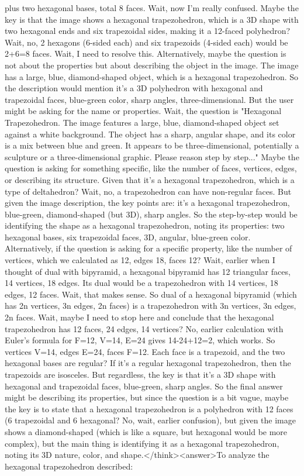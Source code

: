 plus two hexagonal bases, total 8 faces. Wait, now I'm really confused. Maybe the key is that the image shows a hexagonal trapezohedron, which is a 3D shape with two hexagonal ends and six trapezoidal sides, making it a 12-faced polyhedron? Wait, no, 2 hexagons (6-sided each) and six trapezoids (4-sided each) would be 2+6=8 faces. Wait, I need to resolve this. Alternatively, maybe the question is not about the properties but about describing the object in the image. The image has a large, blue, diamond-shaped object, which is a hexagonal trapezohedron. So the description would mention it's a 3D polyhedron with hexagonal and trapezoidal faces, blue-green color, sharp angles, three-dimensional. But the user might be asking for the name or properties. Wait, the question is "Hexagonal Trapezohedron. The image features a large, blue, diamond-shaped object set against a white background. The object has a sharp, angular shape, and its color is a mix between blue and green. It appears to be three-dimensional, potentially a sculpture or a three-dimensional graphic. Please reason step by step..." Maybe the question is asking for something specific, like the number of faces, vertices, edges, or describing its structure. Given that it's a hexagonal trapezohedron, which is a type of deltahedron? Wait, no, a trapezohedron can have non-regular faces. But given the image description, the key points are: it's a hexagonal trapezohedron, blue-green, diamond-shaped (but 3D), sharp angles. So the step-by-step would be identifying the shape as a hexagonal trapezohedron, noting its properties: two hexagonal bases, six trapezoidal faces, 3D, angular, blue-green color. Alternatively, if the question is asking for a specific property, like the number of vertices, which we calculated as 12, edges 18, faces 12? Wait, earlier when I thought of dual with bipyramid, a hexagonal bipyramid has 12 triangular faces, 14 vertices, 18 edges. Its dual would be a trapezohedron with 14 vertices, 18 edges, 12 faces. Wait, that makes sense. So dual of a hexagonal bipyramid (which has 2n vertices, 3n edges, 2n faces) is a trapezohedron with 3n vertices, 3n edges, 2n faces. Wait, maybe I need to stop here and conclude that the hexagonal trapezohedron has 12 faces, 24 edges, 14 vertices? No, earlier calculation with Euler's formula for F=12, V=14, E=24 gives 14-24+12=2, which works. So vertices V=14, edges E=24, faces F=12. Each face is a trapezoid, and the two hexagonal bases are regular? If it's a regular hexagonal trapezohedron, then the trapezoids are isosceles. But regardless, the key is that it's a 3D shape with hexagonal and trapezoidal faces, blue-green, sharp angles. So the final answer might be describing its properties, but since the question is a bit vague, maybe the key is to state that a hexagonal trapezohedron is a polyhedron with 12 faces (6 trapezoidal and 6 hexagonal? No, wait, earlier confusion), but given the image shows a diamond-shaped (which is like a square, but hexagonal would be more complex), but the main thing is identifying it as a hexagonal trapezohedron, noting its 3D nature, color, and shape.</think><answer>To analyze the hexagonal trapezohedron described:  

